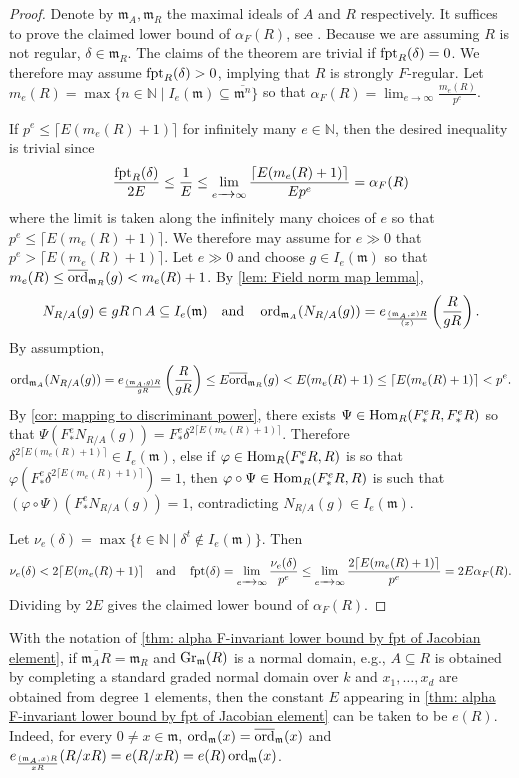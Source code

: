 \documentclass[12pt]{amsart}
\numberwithin{equation}{theorem}
\theoremstyle{plain}
\newcommand{\fm}{\mathfrak{m}}
\newcommand{\NN}{\mathbb{N}}
\begin{document}
\begin{proof}
    Denote by $\fm_A,\fm_R$ the maximal ideals of $A$ and $R$ respectively. It suffices to prove the claimed lower bound of $\alpha_F(R)$, see \cite[Proposition~3.9 (1)]{TY26}. Because we are assuming $R$ is not regular, $\delta\in \fm_R$. The claims of the theorem are trivial if $\operatorname{{fpt}}_R(\delta) = 0$. We therefore may assume $\operatorname{{fpt}}_R(\delta)>0$, implying that $R$ is strongly $F$-regular. Let $m_e(R) = \max\{n\in\NN\mid I_e(\fm)\subseteq \overline{\fm^n}\}$ so that $\alpha_F(R) = \lim_{e\to\infty}\frac{m_e(R)}{p^e}$.
    
    If $p^e \leq \lceil E (m_e(R)+1)\rceil$ for infinitely many $e\in\NN$, then the desired inequality is trivial since
    \[
    \frac{\operatorname{{fpt}}_R(\delta)}{2E}\leq \frac{1}{E} \leq \lim_{e\xrightarrow{\ \ } \infty}\frac{\lceil E (m_e(R)+1)\rceil}{Ep^e} = \alpha_F(R)
    \]
    where the limit is taken along the infinitely many choices of $e$ so that $p^e \leq \lceil E (m_e(R)+1)\rceil$. We therefore may assume for $e\gg 0$ that $p^e>\lceil E (m_e(R)+1)\rceil$. Let $e\gg 0$ and choose $g\in I_e(\fm)$ so that $m_e(R)\leq \overline{\ord}_{\fm_R}(g) < m_e(R) + 1$. By \cref{lem: Field norm map lemma},  
    \[
    N_{R/A}(g)\in gR\cap A\subseteq I_e(\fm)\quad \mbox{and}\quad\ord_{\fm_A}(N_{R/A}(g)) = e_{\frac{(\fm_A,x)R}{(x)}}\left(\frac{R}{gR}\right).
    \]
    By assumption,
    \[
    \ord_{\fm_A}(N_{R/A}(g)) = e_{\frac{(\fm_A,g)R}{gR}}\left(\frac{R}{g R}\right)\leq E\overline{\ord}_{\fm_R}(g) < E(m_e(R)+1)\leq \lceil E (m_e(R)+1)\rceil<p^e.
    \]
    By \cref{cor: mapping to discriminant power}, there exists $\Psi\in \operatorname{Hom}_R(F^e_*R,F^e_*R)$ so that $\Psi(F^e_*N_{R/A}(g)) = F^e_*\delta^{2\lceil E (m_e(R)+1)\rceil}$.  Therefore $\delta^{2\lceil E(m_e(R)+1)\rceil}\in I_e(\fm)$, else if $\varphi\in\operatorname{Hom}_R(F^e_*R,R)$ is so that $\varphi(F^e_*\delta^{2\lceil E (m_e(R)+1)\rceil}) = 1$, then $\varphi\circ\Psi\in \operatorname{Hom}_R(F^e_*R,R)$ is such that $(\varphi\circ\Psi)(F^e_*N_{R/A}(g)) = 1$, contradicting $N_{R/A}(g)\in I_e(\fm)$.

    Let $\nu_e(\delta) = \max\{t\in\NN\mid \delta^t\not\in I_e(\fm)\}$. Then 
    \[
    \nu_e(\delta)<2\lceil E (m_e(R)+1)\rceil \quad\mbox{and}\quad \operatorname{{fpt}}(\delta) = \lim_{e\xrightarrow{\ \ }\infty}\frac{\nu_e(\delta)}{p^e}\leq \lim_{e\xrightarrow{\ \ } \infty}\frac{2\lceil E (m_e(R)+1)\rceil}{p^e} = 2E\alpha_F(R).
    \]
    Dividing by $2E$ gives the claimed lower bound of $\alpha_F(R)$. 
\end{proof}

\begin{remark}
    With the notation of \cref{thm: alpha F-invariant lower bound by fpt of Jacobian element}, if $\overline{\fm_AR} = \fm_R$ and $\Gr_{\fm}(R)$ is a normal domain, e.g., $A\subseteq R$ is obtained by completing a standard graded normal domain over $k$ and $x_1,\ldots,x_d$ are obtained from degree $1$ elements, then the constant $E$ appearing in \cref{thm: alpha F-invariant lower bound by fpt of Jacobian element} can be taken to be $e(R)$. Indeed, for every $0\not=x\in\fm$, $\ord_{\fm}(x) = \overline{\ord}_{\fm}(x)$ and $e_{\frac{(\fm_A,x)R}{xR}}(R/xR) =e(R/xR)= e(R)\ord_{\fm}(x)$.
\end{remark}
\end{document}
